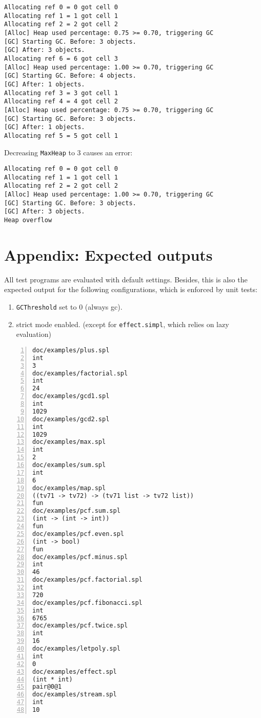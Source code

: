 \documentclass[a4paper]{article}
\begin{document}
\begin{Verbatim}
Allocating ref 0 = 0 got cell 0
Allocating ref 1 = 1 got cell 1
Allocating ref 2 = 2 got cell 2
[Alloc] Heap used percentage: 0.75 >= 0.70, triggering GC
[GC] Starting GC. Before: 3 objects.
[GC] After: 3 objects.
Allocating ref 6 = 6 got cell 3
[Alloc] Heap used percentage: 1.00 >= 0.70, triggering GC
[GC] Starting GC. Before: 4 objects.
[GC] After: 1 objects.
Allocating ref 3 = 3 got cell 1
Allocating ref 4 = 4 got cell 2
[Alloc] Heap used percentage: 0.75 >= 0.70, triggering GC
[GC] Starting GC. Before: 3 objects.
[GC] After: 1 objects.
Allocating ref 5 = 5 got cell 1
\end{Verbatim}

Decreasing \texttt{MaxHeap} to 3 causes an error:

\begin{Verbatim}
Allocating ref 0 = 0 got cell 0
Allocating ref 1 = 1 got cell 1
Allocating ref 2 = 2 got cell 2
[Alloc] Heap used percentage: 1.00 >= 0.70, triggering GC
[GC] Starting GC. Before: 3 objects.
[GC] After: 3 objects.
Heap overflow
\end{Verbatim}

\appendix
\section{Appendix: Expected outputs}

All test programs are evaluated with default settings. Besides, this is also the expected output for the following configurations, which is enforced by unit tests:

\begin{enumerate}
    \item \texttt{GCThreshold} set to 0 (always gc).
    \item strict mode enabled. (except for \texttt{effect.simpl}, which relies on lazy evaluation)
\end{enumerate}

\begin{Verbatim}[numbers=left]
doc/examples/plus.spl
int
3
doc/examples/factorial.spl
int
24
doc/examples/gcd1.spl
int
1029
doc/examples/gcd2.spl
int
1029
doc/examples/max.spl
int
2
doc/examples/sum.spl
int
6
doc/examples/map.spl
((tv71 -> tv72) -> (tv71 list -> tv72 list))
fun
doc/examples/pcf.sum.spl
(int -> (int -> int))
fun
doc/examples/pcf.even.spl
(int -> bool)
fun
doc/examples/pcf.minus.spl
int
46
doc/examples/pcf.factorial.spl
int
720
doc/examples/pcf.fibonacci.spl
int
6765
doc/examples/pcf.twice.spl
int
16
doc/examples/letpoly.spl
int
0
doc/examples/effect.spl
(int * int)
pair@0@1
doc/examples/stream.spl
int
10
\end{Verbatim}
\end{document}

